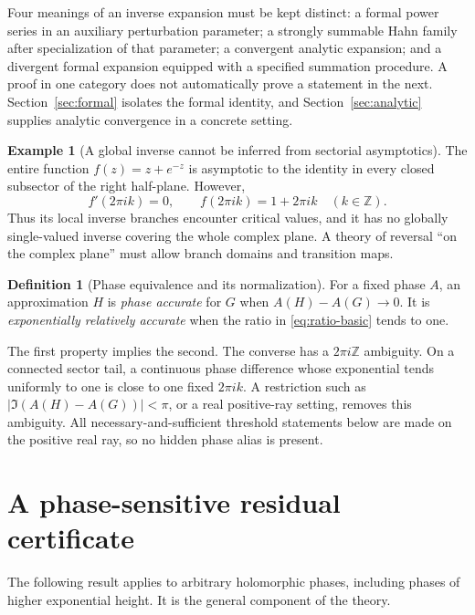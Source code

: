 \documentclass[11pt,a4paper]{article}
\theoremstyle{definition}
\newtheorem{definition}[theorem]{Definition}
\newtheorem{example}[theorem]{Example}
\theoremstyle{remark}
\newcommand{\sect}[1]{Section~\ref{#1}}
\numberwithin{equation}{section}
\begin{document}
Four meanings of an inverse expansion must be kept distinct: a formal power series in an auxiliary perturbation parameter; a strongly summable Hahn family after specialization of that parameter; a convergent analytic expansion; and a divergent formal expansion equipped with a specified summation procedure. A proof in one category does not automatically prove a statement in the next. \sect{sec:formal} isolates the formal identity, and \sect{sec:analytic} supplies analytic convergence in a concrete setting.

\begin{example}[A global inverse cannot be inferred from sectorial asymptotics]\label{ex:global}
The entire function $f(z)=z+e^{-z}$ is asymptotic to the identity in every closed subsector of the right half-plane. However,
\[
 f'(2\pi i k)=0,\qquad f(2\pi i k)=1+2\pi i k\quad(k\in\mathbb Z).
\]
Thus its local inverse branches encounter critical values, and it has no globally single-valued inverse covering the whole complex plane. A theory of reversal ``on the complex plane'' must allow branch domains and transition maps.
\end{example}

\begin{definition}[Phase equivalence and its normalization]
For a fixed phase $A$, an approximation $H$ is \emph{phase accurate} for $G$ when $A(H)-A(G)\to0$. It is \emph{exponentially relatively accurate} when the ratio in \eqref{eq:ratio-basic} tends to one.
\end{definition}
The first property implies the second. The converse has a $2\pi i\mathbb Z$ ambiguity. On a connected sector tail, a continuous phase difference whose exponential tends uniformly to one is close to one fixed $2\pi i k$. A restriction such as $|\Im(A(H)-A(G))|<\pi$, or a real positive-ray setting, removes this ambiguity. All necessary-and-sufficient threshold statements below are made on the positive real ray, so no hidden phase alias is present.

\section{A phase-sensitive residual certificate}\label{sec:certificate}

The following result applies to arbitrary holomorphic phases, including phases of higher exponential height. It is the general component of the theory.
\end{document}
